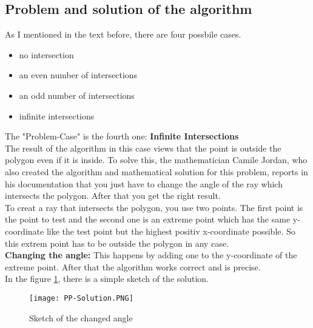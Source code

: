 \documentclass[12pt,a4paper]{scrreprt}
\begin{document}
\subsection{Problem and solution of the algorithm}
\begin{flushleft}
As I mentioned in the text before, there are four possbile cases. 
\vspace{0.1cm}
\begin{itemize}
\item no intersection
\item an even number of intersections
\item an odd number of intersections
\item infinite intersections
\end{itemize}
\vspace{0.1cm}
The "Problem-Case" is the fourth one: \textbf{Infinite Intersections}\\
The result of the algorithm in this case views that the point is outside the polygon even if it is inside. To solve this, the mathematician Camile Jordan, who also created the algorithm and mathematical solution for this problem, reports in his documentation that you just have to change the angle of the ray which intersects the polygon. After that you get the right result.\\
\vspace{0.5cm}
To creat a ray that intersects the polygon, you use two points. The first point is the point to test and the second one is an extreme point which has the same y-coordinate like the test point but the highest positiv x-coordinate possible. So this extrem point has to be outside the polygon in any case.\\
\vspace{0.5cm}
\textbf{Changing the angle:} This happens by adding one to the y-coordinate of the extreme point. After that the algorithm works correct and is precise.\\
\vspace{0.5cm}
In the figure \ref{problemSketch}, there is a simple sketch of the solution.
\end{flushleft}



\begin{figure}[h] 
\centering
\texttt{[image: PP-Solution.PNG]}
\renewcommand{\figurename}{Fig.}
\caption{Sketch of the changed angle} 
\label{problemSketch}
\end{figure}
\end{document}
